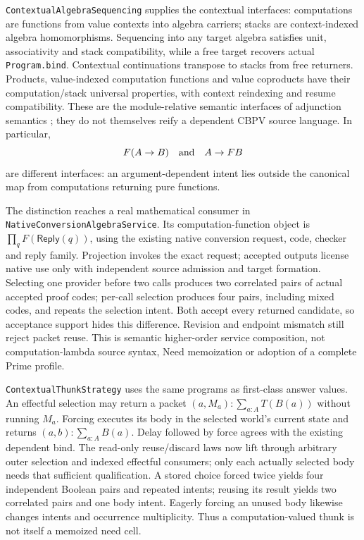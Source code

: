 \documentclass[11pt]{article}
\theoremstyle{definition}
\theoremstyle{remark}
\begin{document}
\nolinkurl{ContextualAlgebraSequencing} supplies the contextual interfaces:
computations are functions from value contexts into algebra carriers;
stacks are context-indexed algebra homomorphisms. Sequencing into any target
algebra satisfies unit, associativity and stack compatibility, while a free
target recovers actual \texttt{Program.bind}. Contextual continuations
transpose to stacks from free returners. Products, value-indexed computation
functions and value coproducts have their computation/stack universal
properties, with context reindexing and resume compatibility. These are the
module-relative semantic interfaces of adjunction semantics
\cite{LevyAdjunctionSemantics}; they do not themselves reify a dependent
CBPV source language.
In particular,
\[
  F(A\to B)\quad\hbox{and}\quad A\to F B
\]
are different interfaces: an argument-dependent intent lies outside the
canonical map from computations returning pure functions.

The distinction reaches a real mathematical consumer in
\nolinkurl{NativeConversionAlgebraService}. Its computation-function object
is $\prod_q F(\mathsf{Reply}(q))$, using the existing native conversion
request, code, checker and reply family. Projection invokes the exact request;
accepted outputs license native use only with independent source admission
and target formation. Selecting one provider before two calls produces two
correlated pairs of actual accepted proof codes; per-call selection produces
four pairs, including mixed codes, and repeats the selection intent.
Both accept every returned candidate, so acceptance support hides this
difference. Revision and endpoint mismatch still reject packet reuse.
This is semantic higher-order service composition, not computation-lambda
source syntax, Need memoization or adoption of a complete Prime profile.

\nolinkurl{ContextualThunkStrategy} uses the same programs as first-class
answer values. An effectful selection may return a packet
$(a,M_a):\sum_{a:A}T(B(a))$ without running $M_a$. Forcing executes its body
in the selected world's current state and returns $(a,b):\sum_{a:A}B(a)$.
Delay followed by force agrees with the existing dependent bind. The
read-only reuse/discard laws now lift through arbitrary outer selection and
indexed effectful consumers; only each actually selected body needs that
sufficient qualification. A stored choice forced twice yields four independent
Boolean pairs and repeated intents; reusing its result yields two correlated
pairs and one body intent. Eagerly forcing an unused body likewise changes
intents and occurrence multiplicity. Thus a computation-valued thunk is not
itself a memoized need cell.
\end{document}
